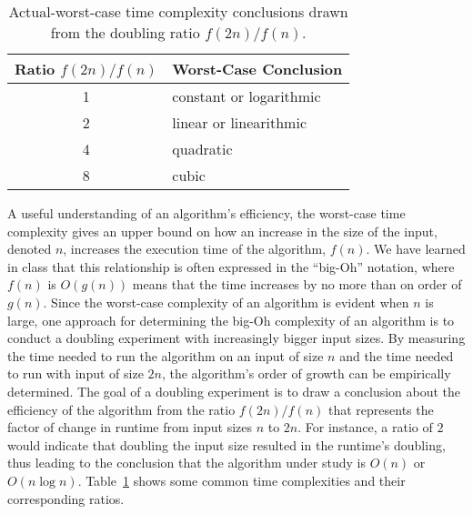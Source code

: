 \begin{table}[t]

  \begin{center}

    \begin{tabular}{c|l}
      Ratio $f(2n)/f(n)$ & Worst-Case Conclusion              \\ \hline
      1                  & constant or logarithmic \\
      2                  & linear or linearithmic  \\
      4                  & quadratic               \\
      8                  & cubic                   \\
    \end{tabular}

  \end{center}
  \vspace*{-.25in}

  \caption{Actual-worst-case time complexity conclusions drawn from the doubling ratio $f(2n)/f(n)$.}\label{table:ratios}

\end{table}

A useful understanding of an algorithm's efficiency, the worst-case time complexity gives an upper bound on how an
increase in the size of the input, denoted $n$, increases the execution time of the algorithm, $f(n)$. We have learned
in class that this relationship is often expressed in the ``big-Oh'' notation, where $f(n)$ is $O(g(n))$ means that the
time increases by no more than on order of $g(n)$. Since the worst-case complexity of an algorithm is evident when $n$
is large, one approach for determining the big-Oh complexity of an algorithm is to conduct a doubling experiment with
increasingly bigger input sizes. By measuring the time needed to run the algorithm on an input of size $n$ and the time
needed to run with input of size $2n$, the algorithm's order of growth can be empirically determined.
The goal of a doubling experiment is to draw a conclusion about the efficiency of the algorithm from the ratio
$f(2n)/f(n)$ that represents the factor of change in runtime from input sizes $n$ to $2n$. For instance, a ratio of $2$
would indicate that doubling the input size resulted in the runtime's doubling, thus leading to the conclusion that the
algorithm under study is $O(n)$ or $O(n\log n)$. Table~\ref{table:ratios} shows some common time complexities and their
corresponding ratios.

